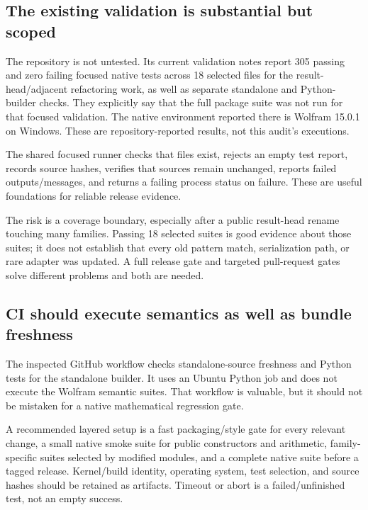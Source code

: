 \documentclass[11pt,a4paper]{article}
\theoremstyle{definition}
\begin{document}
\subsection{The existing validation is substantial but scoped}

The repository is not untested. Its current validation notes report 305 passing and zero failing focused native tests across 18 selected files for the result-head/adjacent refactoring work, as well as separate standalone and Python-builder checks. They explicitly say that the full package suite was not run for that focused validation. The native environment reported there is Wolfram 15.0.1 on Windows. These are repository-reported results, not this audit's executions.\cite{validation,focusedselection}

The shared focused runner checks that files exist, rejects an empty test report, records source hashes, verifies that sources remain unchanged, reports failed outputs/messages, and returns a failing process status on failure. These are useful foundations for reliable release evidence.\cite{focusedrunner}

The risk is a coverage boundary, especially after a public result-head rename touching many families. Passing 18 selected suites is good evidence about those suites; it does not establish that every old pattern match, serialization path, or rare adapter was updated. A full release gate and targeted pull-request gates solve different problems and both are needed.

\subsection{CI should execute semantics as well as bundle freshness}

The inspected GitHub workflow checks standalone-source freshness and Python tests for the standalone builder. It uses an Ubuntu Python job and does not execute the Wolfram semantic suites. That workflow is valuable, but it should not be mistaken for a native mathematical regression gate.\cite{workflow}

A recommended layered setup is a fast packaging/style gate for every relevant change, a small native smoke suite for public constructors and arithmetic, family-specific suites selected by modified modules, and a complete native suite before a tagged release. Kernel/build identity, operating system, test selection, and source hashes should be retained as artifacts. Timeout or abort is a failed/unfinished test, not an empty success.
\end{document}
